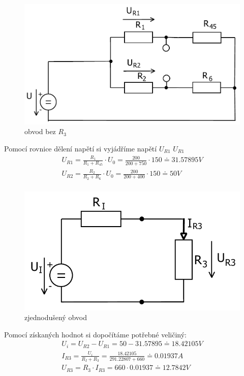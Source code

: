\begin{figure}[H]
		\center\includegraphics[width=0.6\linewidth]{obr/2_4.pdf}
		\caption{obvod bez ${R_3}$}
	\end{figure}
Pomocí rovnice dělení napětí si vyjádříme napětí ${U_{R1}}$ ${U_{R1}}$
\begin{gather*}
U_{R1}=\frac{R_1}{R_1+R_{45}}\cdot U_0=\frac{200}{200+750}\cdot 150\doteq31.57895V\\
U_{R2}=\frac{R_2}{R_2+R_6}\cdot U_0=\frac{200}{200+400}\cdot 150\doteq50V\\
\end{gather*}

\begin{figure}[H]
		\center\includegraphics[width=0.6\linewidth]{obr/2_3.pdf}
		\caption{zjednodušený obvod}
	\end{figure}
Pomocí získaných hodnot si dopočítáme potřebné veličiný:	
\begin{gather*}
U_i=U_{R2}-U_{R1}=50-31.57895\doteq18.42105V\\
I_{R3}=\frac{U_i}{R_I+R_3}=\frac{18.42105}{291.22807+660}\doteq0.01937A\\
U_{R3}=R_3\cdot I_{R3}=660\cdot0.01937\doteq12.7842V
\end{gather*}